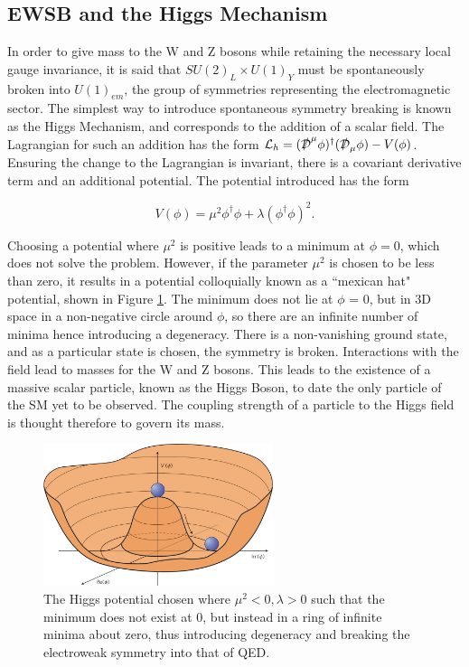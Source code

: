 \subsection{EWSB and the Higgs Mechanism}

In order to give mass to the W and Z bosons while retaining the necessary local gauge invariance, it is said that $SU(2)_{L} \times U(1)_{Y}$ must be spontaneously broken into $U(1)_{em}$, the group of symmetries representing the electromagnetic sector. The simplest way to introduce spontaneous symmetry breaking is known as the Higgs Mechanism, and corresponds to the addition of a scalar field. The Lagrangian for such an addition has the form ${\mathcal{L}}_{h} = (\slashed{\mathcal{D}}^{\mu}\phi)^{\dagger}(\slashed{\mathcal{D}}_{\mu}\phi) - V(\phi)$. Ensuring the change to the Lagrangian is invariant, there is a covariant derivative term and an additional potential. The potential introduced has the form

\begin{equation}
V(\phi) = \mu^{2}\phi^{\dagger}\phi + \lambda (\phi^{\dagger}\phi)^{2}.
\end{equation}

Choosing a potential where $\mu^{2}$ is positive leads to a minimum at $\phi = 0$, which does not solve the problem. However, if the parameter $\mu^{2}$ is chosen to be less than zero, it results in a potential colloquially known as a ``mexican hat" potential, shown in Figure \ref{fig:MexicanHat}. The minimum does not lie at $\phi$ = 0, but in 3D space in a non-negative circle around $\phi$, so there are an infinite number of minima hence introducing a degeneracy. There is a non-vanishing ground state, and as a particular state is chosen, the symmetry is broken. Interactions with the field lead to masses for the W and Z bosons. This leads to the existence of a massive scalar particle, known as the Higgs Boson, to date the only particle of the SM yet to be observed. The coupling strength of a particle to the Higgs field is thought therefore to govern its mass.

\begin{figure}
\centering
\includegraphics[width=0.6\textwidth]{Figures/Theory/MHat}
\caption[The Higgs potential chosen where $\mu^{2} < 0, \lambda > 0$ introducing degeneracy and breaking the electroweak symmetry into that of QED.]{\label{fig:MexicanHat}The Higgs potential chosen where $\mu^{2} < 0, \lambda > 0$ such that the minimum does not exist at 0, but instead in a ring of infinite minima about zero, thus introducing degeneracy and breaking the electroweak symmetry into that of QED.~\cite{MexHat}}
\end{figure}

